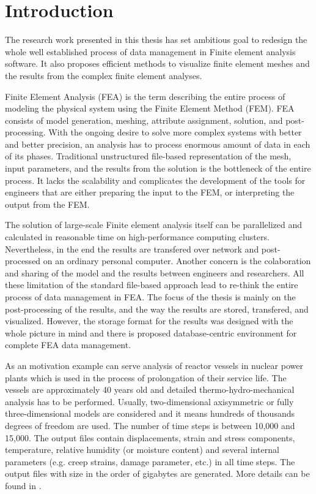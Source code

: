 \chapter{Introduction}
\label{chapter-introduction}

The research work presented in this thesis has set ambitious goal to redesign the whole well established process of data management in Finite element analysis software. It also proposes efficient methods to visualize finite element meshes and the results from the complex finite element analyses.

Finite Element Analysis (FEA) is the term describing the entire process of modeling the physical system using the Finite Element Method (FEM). FEA consists of model generation, meshing, attribute assignment, solution, and post-processing. With the ongoing desire to solve more complex systems with better and better precision, an analysis has to process enormous amount of data in each of its phases. Traditional unstructured file-based representation of the mesh, input parameters, and the results from the solution is the bottleneck of the entire process. It lacks the scalability and complicates the development of the tools for engineers that are either preparing the input to the FEM, or interpreting the output from the FEM.

The solution of large-scale Finite element analysis itself can be parallelized and calculated in reasonable time on high-performance computing clusters. Nevertheless, in the end the results are transfered over network and post-processed on an ordinary personal computer. Another concern is the colaboration and sharing of the model and the results between engineers and researchers. All these limitation of the standard file-based approach lead to re-think the entire process of data management in FEA. The focus of the thesis is mainly on the post-processing of the results, and the way the results are stored, transfered, and visualized. However, the storage format for the results was designed with the whole picture in mind and there is proposed database-centric environment for complete FEA data management.

As an motivation example can serve analysis of reactor vessels in nuclear power plants which is used in the process of prolongation of their service life. The vessels are approximately 40 years old and detailed thermo-hydro-mechanical analysis has to be performed. Usually, two-dimensional axisymmetric or fully three-dimensional models are considered and it means hundreds of thousands degrees of freedom are used. The number of time steps is between 10,000 and 15,000. The output files contain displacements, strain and stress components, temperature, relative humidity (or moisture content) and several internal parameters (e.g. creep strains, damage parameter, etc.) in all time steps. The output files with size in the order of gigabytes are generated. More details can be found in \cite{XXX-1,XXX-2}.

